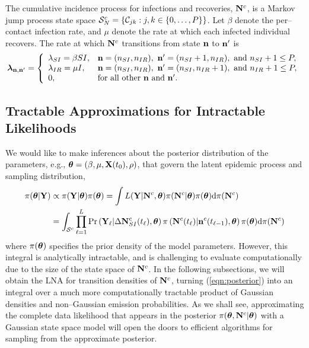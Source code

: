 The cumulative incidence process for infections and recoveries, $ \mathbf{N}^c $, is a Markov jump process state space $ \mathcal{S}_N^c = \left \lbrace \mathcal{C}_{jk}:j,k\in\lbrace0,\dots,P\rbrace\right \rbrace $. Let $ \beta $ denote the per--contact infection rate, and $ \mu $ denote the rate at which each infected individual recovers. The rate at which $ \mathbf{N}^c $ transitions from state $ \mathbf{n} $ to $ \mathbf{n}^{\prime}$ is 
\begin{equation}
	\label{eqn:lna_sir_rates}
	\boldsymbol{\lambda}_{\mathbf{n},\mathbf{n}^\prime} = \left \lbrace \begin{array}{ll}
	\lambda_{SI} = \beta S I, & \mathbf{n} = (n_{SI},n_{IR}),\ \mathbf{n}^\prime = (n_{SI}+1,n_{IR}),\text{ and } n_{SI}+1\leq P, \\
	 \lambda_{IR} = \mu I, &  \mathbf{n} = (n_{SI},n_{IR}),\  \mathbf{n}^\prime = (n_{SI},n_{IR}+1),\text{ and } n_{IR}+1\leq P, \\
	 0, & \text{for all other } \mathbf{n} \text{ and } \mathbf{n}^\prime.
	\end{array} \right.
\end{equation}

\subsection{Tractable Approximations for Intractable Likelihoods}
\label{subsec:lna_motivation}
We would like to make inferences about the posterior distribution of the parameters, e.g., $ \boldsymbol{\theta} = (\beta, \mu, \mathbf{X}(t_0), \rho)$, that govern the latent epidemic process and sampling distribution, 
\begin{align}
\label{eqn:posterior}
 \pi(\boldsymbol{\theta}|\mathbf{Y})&\propto \pi(\mathbf{Y}|\boldsymbol{\theta})\pi(\boldsymbol{\theta}) = \int L(\mathbf{Y}|\mathbf{N}^c,\boldsymbol{\theta})\pi(\mathbf{N}^c|\boldsymbol{\theta})\pi(\boldsymbol{\theta})\mathrm{d}\pi(\mathbf{N}^c)\nonumber\\
 &= \int_{\mathcal{S}^c}\prod_{\ell=1}^L \Pr\left (\mathbf{Y}_\ell|\Delta\mathbf{N}_{SI}^c(t_\ell),\boldsymbol{\theta}\right )\pi\left (\mathbf{N}^c(t_\ell)|\mathbf{n}^c(t_{\ell-1}),\boldsymbol{\theta}\right )\pi(\boldsymbol{\theta})\mathrm{d}\pi(\mathbf{N}^c)
\end{align}
where $ \pi(\boldsymbol{\theta}) $ specifies the prior density of the model parameters. However, this integral is analytically intractable, and is challenging to evaluate computationally due to the size of the state space of $ \mathbf{N}^c $. In the following subsections, we will obtain the LNA for transition densities of $ \mathbf{N}^c $, turning (\ref{eqn:posterior}) into an integral over a much more computationally tractable product of Gaussian densities and non--Gaussian emission probabilities. As we shall see, approximating the complete data likelihood that appears in the posterior $ \pi(\boldsymbol{\theta},\mathbf{N}^c|\boldsymbol{\theta}) $ with a Gaussian state space model will open the doors to efficient algorithms for sampling from the approximate posterior. 


